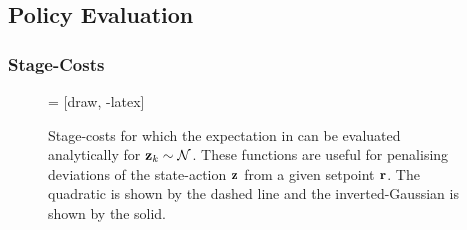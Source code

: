 \subsection{Policy Evaluation}
\subsubsection{Stage-Costs}

\begin{figure}[t]
\centering
{} = [draw, -latex]
%
\caption{Stage-costs for which the expectation in  can be evaluated analytically for $\mathbf{z}_k \sim \mathcal{N}$. These functions are useful for penalising deviations of the state-action $\mathbf{z}$ from a given setpoint $\mathbf{r}$. The quadratic is shown by the dashed line and the inverted-Gaussian is shown by the solid.}
\label{fig:cost_costs}
\end{figure}


